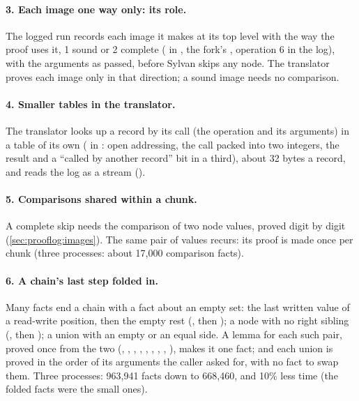 \paragraph{3. Each image one way only: its role.} The logged run records
each image it makes at its top level with the way the proof uses it, 1
sound or 2 complete ( in , the
fork's , operation 6 in the log), with the arguments
as passed, before Sylvan skips any node. The translator proves each image
only in that direction; a sound image needs no comparison.

\paragraph{4. Smaller tables in the translator.} The translator looks up a
record by its call (the operation and its arguments) in a table of its own
( in : open addressing, the call
packed into two integers, the result and a ``called by another record''
bit in a third), about 32 bytes a record, and reads the log as a stream
().

\paragraph{5. Comparisons shared within a chunk.} A complete skip needs the
comparison  of two node values, proved digit by digit
(\cref{sec:prooflog:images}). The same pair of values recurs: its proof is
made once per chunk (three processes: about 17,000 comparison facts).

\paragraph{6. A chain's last step folded in.} Many facts end a chain with
a fact about an empty set: the last written value of a read-write
position, then the empty rest (, then ); a node
with no right sibling (, then ); a union
with an empty or an equal side. A lemma for each such pair, proved once
from the two (, , ,
, , , , ,
), makes it one fact; and each union is proved in the order
of its arguments the caller asked for, with no fact to swap them. Three
processes: 963,941 facts down to 668,460, and 10\% less time (the folded
facts were the small ones).

